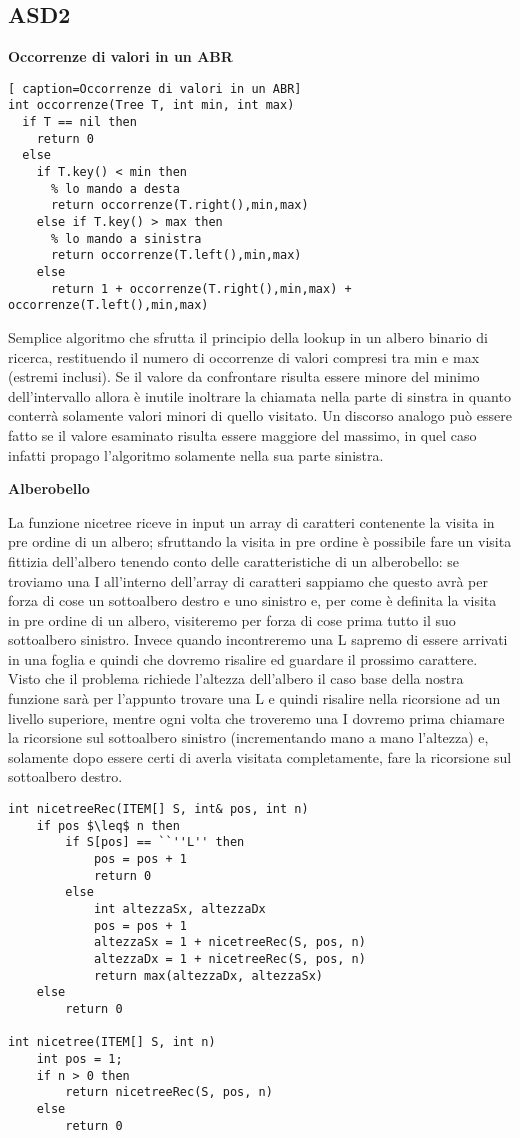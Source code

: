 \documentclass[../cheatSheetAlgoritmi.tex]{subfiles}
\begin{document}
\subsection{ASD2}
\textbf{Occorrenze di valori in un ABR}
\begin{lstlisting}[ caption=Occorrenze di valori in un ABR]
int occorrenze(Tree T, int min, int max)
  if T == nil then
    return 0
  else
    if T.key() < min then 
      % lo mando a desta
      return occorrenze(T.right(),min,max)
    else if T.key() > max then 
      % lo mando a sinistra
      return occorrenze(T.left(),min,max)
    else
      return 1 + occorrenze(T.right(),min,max) + occorrenze(T.left(),min,max)
\end{lstlisting}
Semplice algoritmo che sfrutta il principio della lookup in un albero binario di ricerca, restituendo il numero di occorrenze di valori compresi tra min e max (estremi inclusi). 
Se il valore da confrontare risulta essere minore del minimo dell'intervallo allora è inutile inoltrare la chiamata nella parte di sinstra in quanto conterrà solamente valori minori di quello visitato. Un discorso analogo può essere fatto se il valore esaminato risulta essere maggiore del massimo, in quel caso infatti propago l'algoritmo solamente nella sua parte sinistra.

\bigskip

\textbf{Alberobello}

La funzione nicetree riceve in input un array di caratteri contenente la visita in pre ordine di un albero; sfruttando la visita in pre ordine è possibile fare un visita fittizia dell'albero tenendo conto delle caratteristiche di un alberobello: se troviamo una I all'interno dell'array di caratteri sappiamo che questo avrà per forza di cose un sottoalbero destro e uno sinistro e, per come è definita la visita in pre ordine di un albero, visiteremo per forza di cose prima tutto il suo sottoalbero sinistro. Invece quando incontreremo una L sapremo di essere arrivati in una foglia e quindi che dovremo risalire ed guardare il prossimo carattere. Visto che il problema richiede l'altezza dell'albero il caso base della nostra funzione sarà per l'appunto trovare una L e quindi risalire nella ricorsione ad un livello superiore, mentre ogni volta che troveremo una I dovremo prima chiamare la ricorsione sul sottoalbero sinistro (incrementando mano a mano l'altezza) e, solamente dopo essere certi di averla visitata completamente, fare la ricorsione sul sottoalbero destro.
\newpage
\begin{lstlisting}[caption=Alberobello]
int nicetreeRec(ITEM[] S, int& pos, int n)
	if pos $\leq$ n then
    	if S[pos] == ``''L'' then
      		pos = pos + 1
      		return 0
    	else
      		int altezzaSx, altezzaDx
      		pos = pos + 1
      		altezzaSx = 1 + nicetreeRec(S, pos, n)
      		altezzaDx = 1 + nicetreeRec(S, pos, n)
      		return max(altezzaDx, altezzaSx)
  	else
    	return 0
    
int nicetree(ITEM[] S, int n)
	int pos = 1;
  	if n > 0 then
    	return nicetreeRec(S, pos, n)
  	else
    	return 0
\end{lstlisting}
\end{document}
